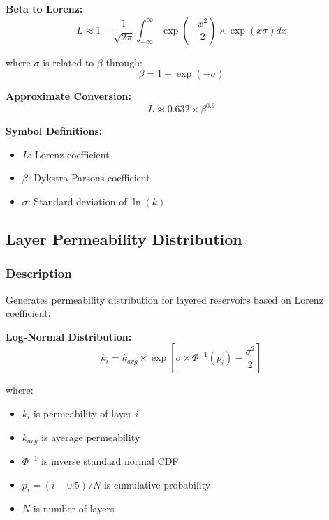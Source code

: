 \documentclass[11pt,a4paper]{article}
\newcommand{\symitem}[2]{\item \textbf{#1}: #2}
\begin{document}
\begin{tcolorbox}[colback=formulabox,colframe=black!75]
\textbf{Beta to Lorenz:}
\begin{equation}
L \approx 1 - \frac{1}{\sqrt{2\pi}} \int_{-\infty}^{\infty} \exp\left(-\frac{x^2}{2}\right) \times \exp(x \sigma) dx
\end{equation}

where $\sigma$ is related to $\beta$ through:
\begin{equation}
\beta = 1 - \exp(-\sigma)
\end{equation}

\textbf{Approximate Conversion:}
\begin{equation}
L \approx 0.632 \times \beta^{0.9}
\end{equation}
\end{tcolorbox}

\textbf{Symbol Definitions:}
\begin{itemize}[leftmargin=2cm]
\symitem{$L$}{Lorenz coefficient}
\symitem{$\beta$}{Dykstra-Parsons coefficient}
\symitem{$\sigma$}{Standard deviation of $\ln(k)$}
\end{itemize}

\subsection{Layer Permeability Distribution}

\subsubsection{Description}
Generates permeability distribution for layered reservoirs based on Lorenz coefficient.

\begin{tcolorbox}[colback=formulabox,colframe=black!75]
\textbf{Log-Normal Distribution:}
\begin{equation}
k_i = k_{avg} \times \exp\left[\sigma \times \Phi^{-1}(p_i) - \frac{\sigma^2}{2}\right]
\end{equation}

where:
\begin{itemize}
\item $k_i$ is permeability of layer $i$
\item $k_{avg}$ is average permeability
\item $\Phi^{-1}$ is inverse standard normal CDF
\item $p_i = (i - 0.5)/N$ is cumulative probability
\item $N$ is number of layers
\end{itemize}
\end{tcolorbox}
\end{document}
